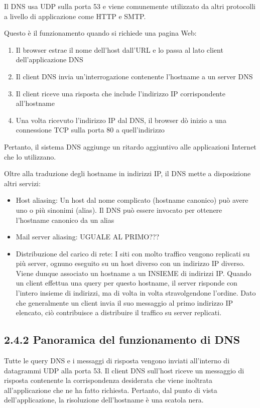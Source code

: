 \documentclass{book}
\begin{document}
Il DNS usa UDP sulla porta 53 e viene comunemente utilizzato da altri protocolli a livello di applicazione come HTTP e SMTP.

Questo è il funzionamento quando si richiede una pagina Web:
\begin{enumerate}
	\item Il browser estrae il nome dell'host dall'URL e lo passa al lato client dell'applicazione DNS
	\item Il client DNS invia un'interrogazione contenente l'hostname a un server DNS
	\item Il client riceve una risposta che include l'indirizzo IP corrispondente all'hostname
	\item Una volta ricevuto l'indirizzo IP dal DNS, il browser dò inizio a una connessione TCP sulla porta 80 a quell'indirizzo
\end{enumerate}

Pertanto, il sistema DNS aggiunge un ritardo aggiuntivo alle applicazioni Internet che lo utilizzano.

Oltre alla traduzione degli hostname in indirizzi IP, il DNS mette a disposizione altri servizi:
\begin{itemize}
	\item Host aliasing: Un host dal nome complicato (hostname canonico) può avere uno o più sinonimi (alias). Il DNS può essere invocato per ottenere l'hostname canonico da un alias
	\item Mail server aliasing: UGUALE AL PRIMO???
	\item Distribuzione del carico di rete: I siti con molto traffico vengono replicati su più server, ognuno eseguito su un host diverso con un indirizzo IP diverso. Viene dunque associato un hostname a un INSIEME di indirizzi IP. Quando un client effettua una query per questo hostname, il server risponde con l'intero insieme di indirizzi, ma di volta in volta stravolgendone l'ordine. Dato che generalmente un client invia il suo messaggio al primo indirizzo IP elencato, ciò contribuisce a distribuire il traffico su server replicati.
\end{itemize}

\subsection*{2.4.2 Panoramica del funzionamento di DNS}
Tutte le query DNS e i messaggi di risposta vengono inviati all'interno di datagrammi UDP alla porta 53. Il client DNS sull'host riceve un messaggio di risposta contenente la corrispondenza desiderata che viene inoltrata all'applicazione che ne ha fatto richiesta. Pertanto, dal punto di vista dell'applicazione, la risoluzione dell'hostname è una scatola nera.
\end{document}
